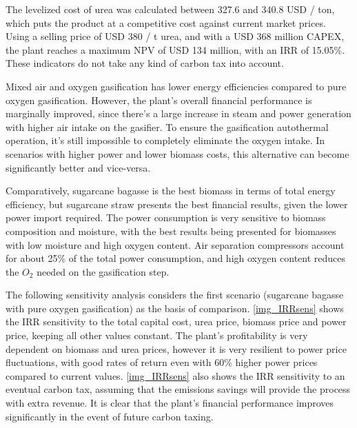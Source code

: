 \documentclass[a4paper, titlepage]{article}
\begin{document}
The levelized cost of urea was calculated between 327.6 and 340.8 USD / ton, which puts the product at a
competitive cost against current market prices. Using a selling price of USD 380 / t urea, and with a USD 368
million CAPEX, the plant reaches a maximum NPV of USD 134 million, with an IRR of 15.05\%. These indicators do not take
any kind of carbon tax into account.

Mixed air and oxygen gasification has lower energy efficiencies compared to pure oxygen gasification. However,
the plant's overall financial performance is marginally improved, since there's a large increase in steam and power
generation with higher air intake on the gasifier. To ensure the gasification autothermal operation, it's still
impossible to completely eliminate the oxygen intake. In scenarios with higher power and lower biomass costs,
this alternative can become significantly better and vice-versa.

Comparatively, sugarcane bagasse is the best biomass in terms of total energy efficiency, but sugarcane straw presents
the best financial results, given the lower power import required. The power consumption is very sensitive to biomass
composition and moisture, with the best results being presented for biomasses with low moisture and high oxygen content.
Air separation compressors account for about 25\% of the total power consumption, and high oxygen content reduces
the $O_2$ needed on the gasification step.

The following sensitivity analysis considers the first scenario (sugarcane bagasse with pure oxygen gasification) as the
basis of comparison. \autoref{img_IRRsens} shows the IRR sensitivity to the total capital cost, urea price, biomass
price and power price, keeping all other values constant. The plant's profitability is very dependent on biomass and
urea prices, however it is very resilient to power price fluctuations, with good rates of return even with 60\% higher
power prices compared to current values. \autoref{img_IRRsens} also shows the IRR sensitivity to an eventual carbon tax,
assuming that the emissions savings will provide the process with extra revenue. It is clear that the plant’s financial
performance improves significantly in the event of future carbon taxing.
\end{document}
